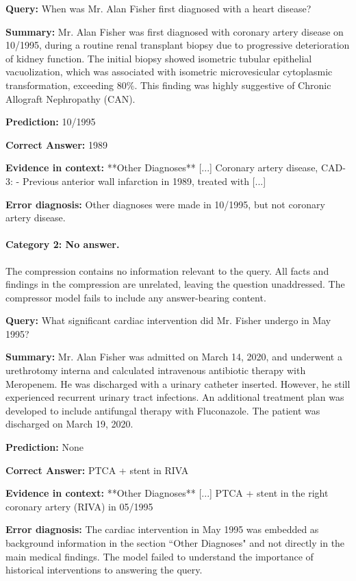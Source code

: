\documentclass{article} %
\begin{document}
\begin{exampleboxmaroon}
\textbf{Query:} When was Mr. Alan Fisher first diagnosed with a heart disease?  

\textbf{Summary:} Mr. Alan Fisher was first diagnosed with coronary artery disease on 10/1995, during a routine renal transplant biopsy due to progressive deterioration of kidney function. The initial biopsy showed isometric tubular epithelial vacuolization, which was associated with isometric microvesicular cytoplasmic transformation, exceeding 80\%. This finding was highly suggestive of Chronic Allograft Nephropathy (CAN).  

\textbf{Prediction:} 10/1995

\textbf{Correct Answer:} 1989

\textbf{Evidence in context:} **Other Diagnoses** [...] Coronary artery disease, CAD-3: - Previous anterior wall infarction in 1989, treated with [...]

\textbf{Error diagnosis:} Other diagnoses were made in 10/1995, but not coronary artery disease. 
\end{exampleboxmaroon}

\paragraph*{Category 2: No answer.}  
The compression contains no information relevant to the query. All facts and findings in the compression are unrelated, leaving the question unaddressed. The compressor model fails to include any answer-bearing content.

\begin{exampleboxmaroon}
\textbf{Query:} What significant cardiac intervention did Mr. Fisher undergo in May 1995?

\textbf{Summary:} Mr. Alan Fisher was admitted on March 14, 2020, and underwent a urethrotomy interna and calculated intravenous antibiotic therapy with Meropenem. He was discharged with a urinary catheter inserted. However, he still experienced recurrent urinary tract infections. An additional treatment plan was developed to include antifungal therapy with Fluconazole. The patient was discharged on March 19, 2020.

\textbf{Prediction:} None  

\textbf{Correct Answer:} PTCA + stent in RIVA

\textbf{Evidence in context:} **Other Diagnoses** [...] PTCA + stent in the right coronary artery (RIVA) in 05/1995

\textbf{Error diagnosis:} The cardiac intervention in May 1995 was embedded as background information in the section ``Other Diagnoses" and not directly in the main medical findings. The model failed to understand the importance of historical interventions to answering the query.

\end{exampleboxmaroon}
\end{document}
